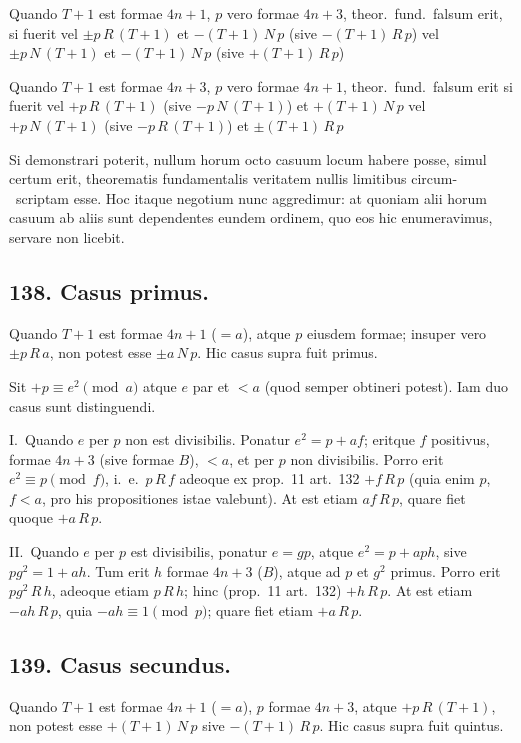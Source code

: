 \documentclass[12pt,a4paper]{article}
\theoremstyle{plain}
\theoremstyle{definition}
\theoremstyle{remark}
\begin{document}
Quando $T+1$ est formae $4n+1$, $p$ vero formae $4n+3$, theor.\ fund.\ falsum erit, si fuerit
vel $\pm p \, R \, (T+1)$ et $-(T+1) \, N \, p$ (sive $-(T+1) \, R \, p$)
vel $\pm p \, N \, (T+1)$ et $-(T+1) \, N \, p$ (sive $+(T+1) \, R \, p$)

Quando $T+1$ est formae $4n+3$, $p$ vero formae $4n+1$, theor.\ fund.\ falsum erit si fuerit
vel $+p \, R \, (T+1)$ (sive $-p \, N \, (T+1)$) et $+(T+1) \, N \, p$
vel $+p \, N \, (T+1)$ (sive $-p \, R \, (T+1)$) et $\pm (T+1) \, R \, p$

Si demonstrari poterit, nullum horum octo casuum locum habere posse,
simul certum erit, theorematis fundamentalis veritatem nullis limitibus circum-\ scriptam esse. Hoc itaque negotium nunc aggredimur: at quoniam alii horum
casuum ab aliis sunt dependentes eundem ordinem, quo eos hic enumeravimus,
servare non licebit.


\subsection*{138. Casus primus.}

Quando $T+1$ est formae $4n+1$ ($= a$), atque $p$ eiusdem
formae; insuper vero $\pm p \, R \, a$, non potest esse $\pm a \, N \, p$. Hic casus supra fuit primus.

Sit $+p \equiv e^2 \pmod{a}$ atque $e$ par et $< a$ (quod semper obtineri potest).
Iam duo casus sunt distinguendi.

I.\ Quando $e$ per $p$ non est divisibilis. Ponatur $e^2 = p + af$; eritque $f$
positivus, formae $4n+3$ (sive formae $B$), $< a$, et per $p$ non divisibilis. Porro
erit $e^2 \equiv p \pmod{f}$, i.~e.\ $p \, R \, f$ adeoque ex prop.~11 art.~132 $+f \, R \, p$ (quia enim
$p$, $f < a$, pro his propositiones istae valebunt). At est etiam $af \, R \, p$, quare fiet
quoque $+a \, R \, p$.

II.\ Quando $e$ per $p$ est divisibilis, ponatur $e = gp$, atque $e^2 = p + aph$,
sive $pg^2 = 1 + ah$. Tum erit $h$ formae $4n+3$ ($B$), atque ad $p$ et $g^2$ primus.
Porro erit $pg^2 \, R \, h$, adeoque etiam $p \, R \, h$; hinc (prop.~11 art.~132) $+h \, R \, p$. At
est etiam $-ah \, R \, p$, quia $-ah \equiv 1 \pmod{p}$; quare fiet etiam $+a \, R \, p$.

\subsection*{139. Casus secundus.}

Quando $T+1$ est formae $4n+1$ ($= a$), $p$ formae $4n+3$,
atque $+p \, R \, (T+1)$, non potest esse $+(T+1) \, N \, p$ sive $-(T+1) \, R \, p$. Hic
casus supra fuit quintus.
\end{document}
